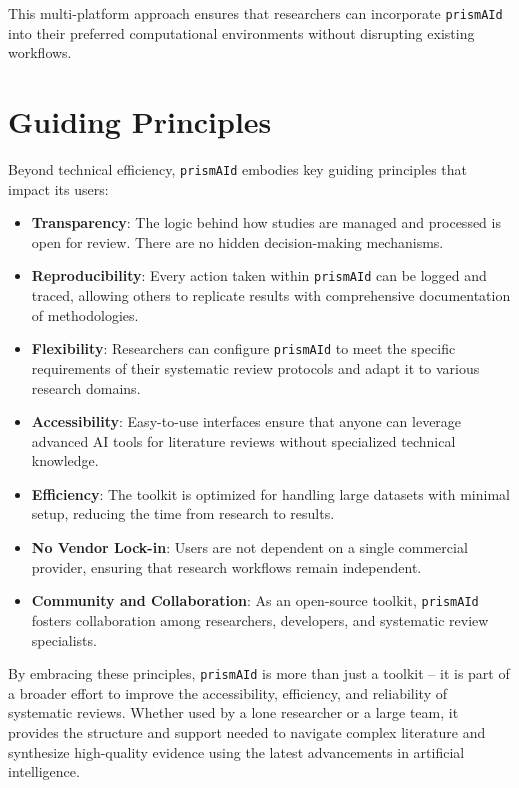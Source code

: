 This multi-platform approach ensures that researchers can incorporate \texttt{prismAId} into their preferred computational environments without disrupting existing workflows.

\section{Guiding Principles}

Beyond technical efficiency, \texttt{prismAId} embodies key guiding principles that impact its users:

\begin{itemize}
    \item \textbf{Transparency}: The logic behind how studies are managed and processed is open for review. There are no hidden decision-making mechanisms.

    \item \textbf{Reproducibility}: Every action taken within \texttt{prismAId} can be logged and traced, allowing others to replicate results with comprehensive documentation of methodologies.

    \item \textbf{Flexibility}: Researchers can configure \texttt{prismAId} to meet the specific requirements of their systematic review protocols and adapt it to various research domains.

    \item \textbf{Accessibility}: Easy-to-use interfaces ensure that anyone can leverage advanced AI tools for literature reviews without specialized technical knowledge.

    \item \textbf{Efficiency}: The toolkit is optimized for handling large datasets with minimal setup, reducing the time from research to results.

    \item \textbf{No Vendor Lock-in}: Users are not dependent on a single commercial provider, ensuring that research workflows remain independent.

    \item \textbf{Community and Collaboration}: As an open-source toolkit, \texttt{prismAId} fosters collaboration among researchers, developers, and systematic review specialists.
\end{itemize}

By embracing these principles, \texttt{prismAId} is more than just a toolkit -- it is part of a broader effort to improve the accessibility, efficiency, and reliability of systematic reviews. Whether used by a lone researcher or a large team, it provides the structure and support needed to navigate complex literature and synthesize high-quality evidence using the latest advancements in artificial intelligence.

